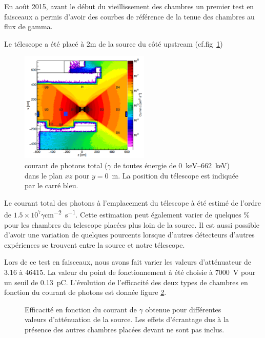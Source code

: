 En août 2015, avant le début du vieillissement des chambres un premier test en faisceaux a permis d'avoir des courbes de référence de la tenue des chambres au flux de gamma.

Le télescope a été placé à 2m de la source du côté upstream (cf.fig~\ref{PositionChambre})

\begin{figure}[!ht]
	\centering
	\includegraphics[width=0.55\textwidth]{GLA/PositionChamber.png}
	\caption{courant de photons total ($\gamma$ de toutes énergie de \SIrange{0}{662}{\kilo\eV}) dans le plan $xz$ pour $y=$\SI{0}{\meter}. La position du télescope est indiquée par le carré bleu.}
	\label{PositionChambre}
\end{figure}

Le courant total des photons à l'emplacement du télescope à été estimé de l'ordre de $1.5\times10^{7}\gamma$\si{cm^{-2}.s^{-1}}. Cette estimation peut également varier de quelques \% pour les chambres du telescope placées plus loin de la source. Il est aussi possible d'avoir une variation de quelques pourcents lorsque d'autres détecteurs d'autres expériences se trouvent entre la source et notre télescope.

Lors de ce test en faisceaux, nous avons fait varier les valeurs d'atténuateur de \num{3.16} à \num{46415}. La valeur du point de fonctionnement à été choisie à \SI{7000}{\volt} pour un seuil de \SI{0.13}{\pico\coulomb}. L'évolution de l'efficacité des deux types de chambres en fonction du courant de photons est donnée figure \ref{ATTENUATEURGIF}.

\begin{figure}[!ht]
	\centering
	\scalebox{1.2}{}
	\caption{Efficacité en fonction du courant de $\gamma$ obtenue pour différentes valeurs d'atténuation de la source. Les effets d'écrantage dus à la présence des autres chambres placées devant ne sont pas inclus.}
	\label{ATTENUATEURGIF}
\end{figure}

